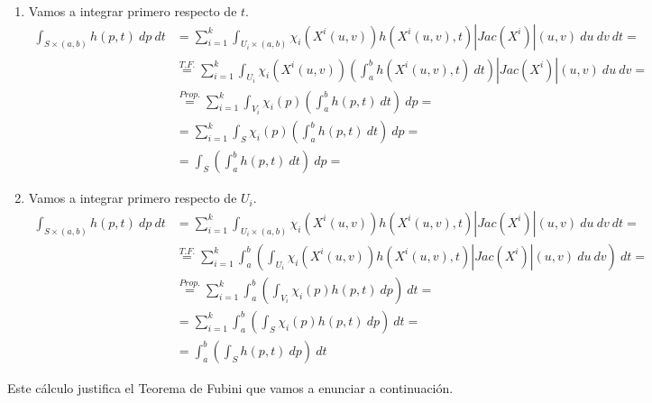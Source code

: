 \begin{enumerate}
    \item Vamos a integrar primero respecto de $t$.
    \begin{align*}
        \int_{S\times(a,b)} h(p,t)\ dp\ dt &= 
        \sum_{i=1}^k \int_{U_i\times(a,b)} \chi_i(X^i(u,v))h(X^i(u,v), t) |Jac(X^i)|(u,v)\ du\ dv\ dt =\\
        &\overset{T.F.}{=}
        \sum_{i=1}^k \int_{U_i} \chi_i(X^i(u,v))\left(\int_a^b h(X^i(u,v), t)\ dt\right)|Jac(X^i)|(u,v)\ du\ dv=\\
        &\overset{Prop.}{=} \sum_{i=1}^k \int_{V_i} \chi_i(p)\left(\int_a^b h(p,t)\ dt\right)\ dp =\\
        &=
        \sum_{i=1}^k \int_S \chi_i(p)\left(\int_a^b h(p,t)\ dt\right)\ dp =\\
        &=
        \int_S \left(\int_a^b h(p,t)\ dt\right)\ dp =\
    \end{align*}
    \item Vamos a integrar primero respecto de $U_i$.
    \begin{align*}
        \int_{S\times(a,b)} h(p,t)\ dp\ dt &= 
        \sum_{i=1}^k \int_{U_i\times(a,b)} \chi_i(X^i(u,v))h(X^i(u,v), t) |Jac(X^i)|(u,v)\ du\ dv\ dt =\\
        &\overset{T.F.}{=}
        \sum_{i=1}^k \int_a^b \left(\int_{U_i} \chi_i(X^i(u,v))h(X^i(u,v), t) |Jac(X^i)|(u,v)\ du\ dv\right)\ dt =\\
        &\overset{Prop.}{=}
        \sum_{i=1}^k \int_a^b \left(\int_{V_i} \chi_i(p) h(p,t)\ dp \right)\ dt =\\
        &=
        \sum_{i=1}^k \int_a^b \left(\int_{S} \chi_i(p) h(p,t)\ dp \right)\ dt =\\
        &=
        \int_a^b \left(\int_{S} h(p,t)\ dp \right)\ dt
    \end{align*}   
\end{enumerate}

Este cálculo justifica el Teorema de Fubini que vamos a enunciar a continuación.

